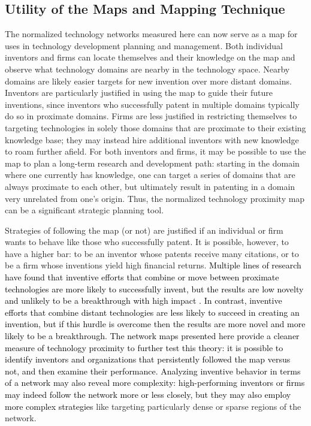 \documentclass[]{svjour3}
\begin{document}
\subsection{Utility of the Maps and Mapping Technique}
The normalized technology networks measured here can now serve as a map for uses in technology development planning and management. Both individual inventors and firms can locate themselves and their knowledge on the map and observe what technology domains are nearby in the technology space. Nearby domains are likely easier targets for new invention over more distant domains. Inventors are particularly justified in using the map to guide their future inventions, since inventors who successfully patent in multiple domains typically do so in proximate domains. Firms are less justified in restricting themselves to targeting technologies in solely those domains that are proximate to their existing knowledge base; they may instead hire additional inventors with new knowledge to roam further afield. For both inventors and firms, it may be possible to use the map to plan a long-term research and development path: starting in the domain where one currently has knowledge, one can target a series of domains that are always proximate to each other, but ultimately result in patenting in a domain very unrelated from one's origin. Thus, the normalized technology proximity map can be a significant strategic planning tool.

Strategies of following the map (or not) are justified if an individual or firm wants to behave like those who successfully patent. It is possible, however, to have a higher bar: to be an inventor whose patents receive many citations, or to be a firm whose inventions yield high financial returns. \textcolor{black}{Multiple lines of research have found that inventive efforts that combine or move between proximate technologies are more likely to successfully invent, but the results are low novelty and unlikely to be a breakthrough with high impact \citep{Fleming2001,Fleming2007, Simonton1999,Chan2011,Chan2015}. In contrast, inventive efforts that combine distant technologies are less likely to succeed in creating an invention, but if this hurdle is overcome then the results are more novel and more likely to be a breakthrough. The network maps presented here provide a cleaner measure of technology proximity to further test this theory: it is possible to identify inventors and organizations that persistently followed the map versus not, and then examine their performance. Analyzing inventive behavior in terms of a network may also reveal more complexity: high-performing inventors or firms may indeed follow the network more or less closely, but they may also employ more complex strategies} like targeting particularly dense or sparse regions of the network.
\end{document}
